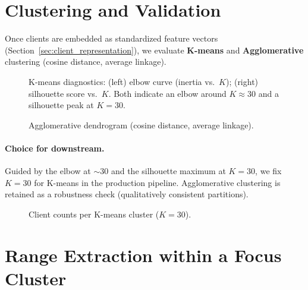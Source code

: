 \documentclass[12pt,a4paper]{report}
\begin{document}
\section{Clustering and Validation}
\label{sec:clustering_validation}

Once clients are embedded as standardized feature vectors (Section~\ref{sec:client_representation}), we evaluate \textbf{K-means} and \textbf{Agglomerative} clustering (cosine distance, average linkage).

\begin{figure}[h]
\centering
\fbox{\rule{0pt}{1.6in}\rule{.6\linewidth}{0pt}}
\hfill
\fbox{\rule{0pt}{1.6in}\rule{.35\linewidth}{0pt}}
\caption{K-means diagnostics: (left) elbow curve (inertia vs.\ $K$); (right) silhouette score vs.\ $K$. Both indicate an elbow around $K\!\approx\!30$ and a silhouette peak at $K\!=\!30$.}
\label{fig:kmeans_valid}
\end{figure}

\begin{figure}[h]
\centering
\fbox{\rule{0pt}{2.0in}\rule{.9\linewidth}{0pt}}
\caption{Agglomerative dendrogram (cosine distance, average linkage).}
\label{fig:agglo_dendro}
\end{figure}

\paragraph{Choice for downstream.}
Guided by the elbow at $\sim\!30$ and the silhouette maximum at $K=30$, we fix \textbf{$K=30$} for K-means in the production pipeline. Agglomerative clustering is retained as a robustness check (qualitatively consistent partitions).

\begin{figure}[h]
\centering
\fbox{\rule{0pt}{1.6in}\rule{.6\linewidth}{0pt}}
\caption{Client counts per K-means cluster ($K=30$).}
\label{fig:n_clients_per_cluster}
\end{figure}

\section{Range Extraction within a Focus Cluster}
\label{sec:focus_cluster_ranges}
\end{document}
